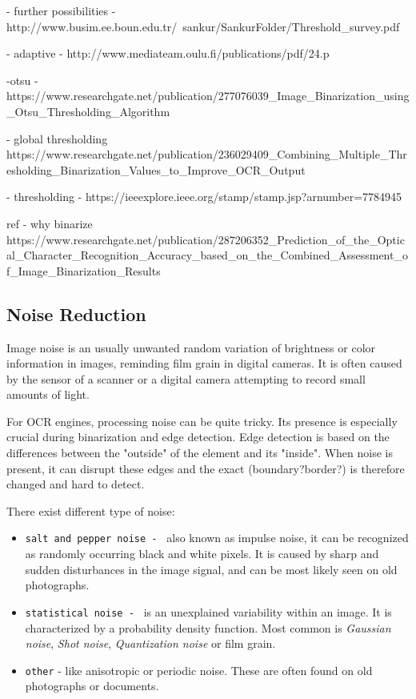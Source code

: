 - further possibilities - http://www.busim.ee.boun.edu.tr/~sankur/SankurFolder/Threshold_survey.pdf

- adaptive - http://www.mediateam.oulu.fi/publications/pdf/24.p

-otsu - https://www.researchgate.net/publication/277076039_Image_Binarization_using_Otsu_Thresholding_Algorithm

- global thresholding https://www.researchgate.net/publication/236029409_Combining_Multiple_Thresholding_Binarization_Values_to_Improve_OCR_Output

- thresholding - https://ieeexplore.ieee.org/stamp/stamp.jsp?arnumber=7784945

ref - why binarize https://www.researchgate.net/publication/287206352_Prediction_of_the_Optical_Character_Recognition_Accuracy_based_on_the_Combined_Assessment_of_Image_Binarization_Results

\subsection{Noise Reduction}

Image noise is an usually unwanted random variation of brightness or color information in images, reminding film grain in digital cameras. It is often caused by the sensor of a scanner or a digital camera attempting to record small amounts of light. 

For OCR engines, processing noise can be quite tricky. Its presence is especially crucial during binarization and edge detection. Edge detection is based on the differences between the "outside" of the element and its "inside". When noise is present, it can disrupt these edges and the exact (boundary?border?) is therefore changed and hard to detect.

There exist different type of noise:

\begin{itemize}
\item\texttt{salt and pepper noise - } also known as impulse noise, it can be recognized as randomly occurring black and white pixels. It is caused by sharp and sudden disturbances in the image signal, and can be most likely seen on old photographs.

\item\texttt{statistical noise - } is an unexplained variability within an image. It is characterized by a probability density function. Most common is \emph{Gaussian noise}, \emph{Shot noise}, \emph{Quantization noise} or film grain.

\item\texttt{other} - like anisotropic or periodic noise. These are often found on old photographs or documents.

\end{itemize}

